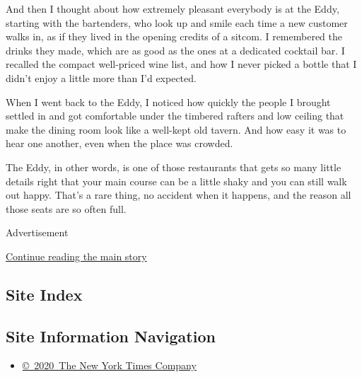 And then I thought about how extremely pleasant everybody is at the
Eddy, starting with the bartenders, who look up and smile each time a
new customer walks in, as if they lived in the opening credits of a
sitcom. I remembered the drinks they made, which are as good as the ones
at a dedicated cocktail bar. I recalled the compact well-priced wine
list, and how I never picked a bottle that I didn't enjoy a little more
than I'd expected.

When I went back to the Eddy, I noticed how quickly the people I brought
settled in and got comfortable under the timbered rafters and low
ceiling that make the dining room look like a well-kept old tavern. And
how easy it was to hear one another, even when the place was crowded.

The Eddy, in other words, is one of those restaurants that gets so many
little details right that your main course can be a little shaky and you
can still walk out happy. That's a rare thing, no accident when it
happens, and the reason all those seats are so often full.

Advertisement

\protect\hyperlink{after-bottom}{Continue reading the main story}

\hypertarget{site-index}{%
\subsection{Site Index}\label{site-index}}

\hypertarget{site-information-navigation}{%
\subsection{Site Information
Navigation}\label{site-information-navigation}}

\begin{itemize}
\tightlist
\item
  \href{https://help.nytimes3xbfgragh.onion/hc/en-us/articles/115014792127-Copyright-notice}{©~2020~The
  New York Times Company}
\end{itemize}

